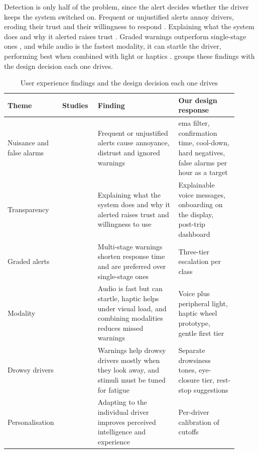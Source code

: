 Detection is only half of the problem, since the alert decides whether the driver keeps the system switched on. Frequent or unjustified alerts annoy drivers, eroding their trust and their willingness to respond \cite{r28,r18,r19,r10}. Explaining what the system does and why it alerted raises trust \cite{r15,r16,r13,r27}. Graded warnings outperform single-stage ones \cite{r25,r26,r17}, and while audio is the fastest modality, it can startle the driver, performing best when combined with light or haptics \cite{r20,r21,r22,r23,r24}.  groups these findings with the design decision each one drives.



\begin{table}[htbp]
\centering
\caption{User experience findings and the design decision each one drives}
\label{tab:ch2-ux}
\footnotesize
\setlength{\tabcolsep}{3pt}
\renewcommand{\arraystretch}{1.15}
\begin{tabular}{|p{0.17\linewidth}|p{0.15\linewidth}|p{0.34\linewidth}|p{0.25\linewidth}|}
\hline
\textbf{Theme} & \textbf{Studies} & \textbf{Finding} & \textbf{Our design response} \\
\hline
Nuisance and false alarms & \cite{r28,r18,r19,r10} & Frequent or unjustified alerts cause annoyance, distrust and ignored warnings & \gls{ema} filter, confirmation time, cool-down, hard negatives, false alarms per hour as a target \\
\hline
Transparency & \cite{r15,r16,r13,r27} & Explaining what the system does and why it alerted raises trust and willingness to use & Explainable voice messages, onboarding on the display, post-trip dashboard \\
\hline
Graded alerts & \cite{r25,r26,r17} & Multi-stage warnings shorten response time and are preferred over single-stage ones & Three-tier escalation per class \\
\hline
Modality & \cite{r20,r21,r22,r23,r24,r31} & Audio is fast but can startle, haptic helps under visual load, and combining modalities reduces missed warnings & Voice plus peripheral light, haptic wheel prototype, gentle first tier \\
\hline
Drowsy drivers & \cite{r29,r30} & Warnings help drowsy drivers mostly when they look away, and stimuli must be tuned for fatigue & Separate drowsiness tones, eye-closure tier, rest-stop suggestions \\
\hline
Personalisation & \cite{r13,r14} & Adapting to the individual driver improves perceived intelligence and experience & Per-driver calibration of cutoffs \\
\hline
\end{tabular}
\end{table}

